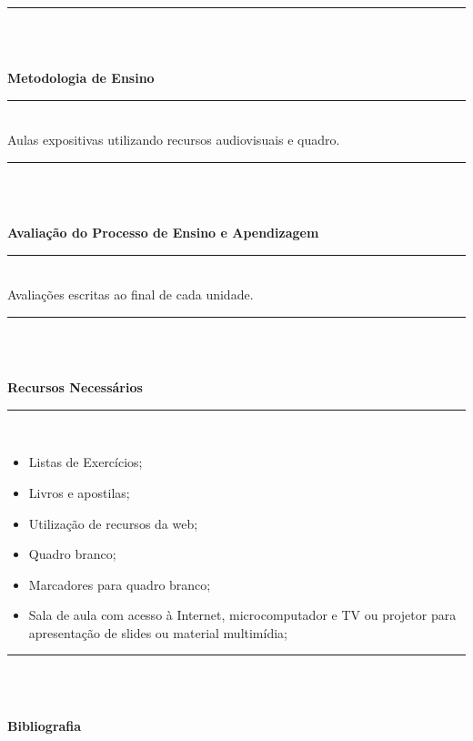 \noindent\rule{16.5cm}{0.4pt}\\
\\
\vspace{-12mm}
\begin{center}\textbf{Metodologia de Ensino}\end{center} 
\vspace{-5mm}
\noindent\rule{16.5cm}{0.4pt}
\\
  Aulas expositivas utilizando recursos audiovisuais e quadro.\\
\noindent\rule{16.5cm}{0.4pt}\\
\\
\vspace{-12mm}
\begin{center}\textbf{Avaliação do Processo de Ensino e Apendizagem}\end{center}
\vspace{-5mm}
\noindent\rule{16.5cm}{0.4pt}
\\
   Avaliações escritas ao final de cada unidade.\\
\noindent\rule{16.5cm}{0.4pt}\\
\\
\vspace{-12mm}
\begin{center}\textbf{Recursos Necessários}\end{center}
\vspace{-5mm}
\noindent\rule{16.5cm}{0.4pt}
\\
\begin{itemize} 
 \item Listas de Exercícios;
   \item Livros e apostilas;
   \item Utilização de recursos da web;
   \item Quadro branco;
   \item Marcadores para quadro branco;
   \item Sala de aula com acesso à Internet, microcomputador e TV ou projetor para apresentação de slides ou material multimídia;
\end{itemize}
\noindent\rule{16.5cm}{0.4pt}\\
\\
\vspace{-12mm}
\begin{center}\textbf{Bibliografia}\end{center}
